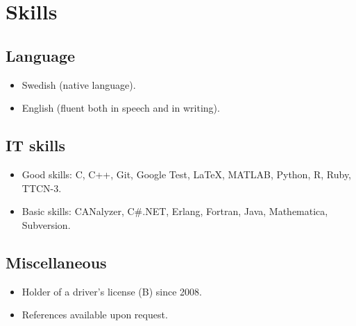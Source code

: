 \documentclass{skvitae}
\begin{document}
	\section{Skills}
	\subsection{Language}
	\begin{itemize}
		\item Swedish (native language).
		\item English (fluent both in speech and in writing).
	\end{itemize}

	\subsection{IT skills}
	\begin{itemize}
		\item Good skills: C, C++, Git, Google Test, \LaTeX, MATLAB, Python, R, Ruby, TTCN-3.
		\item Basic skills: CANalyzer, C\#.NET, Erlang, Fortran, Java, Mathematica, Subversion.
	\end{itemize}

	\subsection{Miscellaneous}
	\begin{itemize}
		\item Holder of a driver's license (B) since 2008.
		\item References available upon request.
	\end{itemize}
\end{document}
